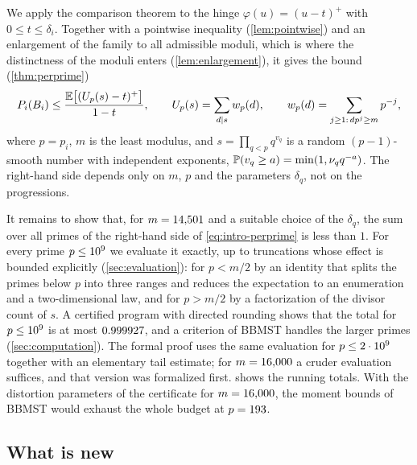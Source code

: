 We apply the comparison theorem to the hinge $\varphi(u)=(u-t)^+$ with $0\le t\le\delta_i$. Together with a pointwise
inequality (\cref{lem:pointwise}) and an enlargement of the family to all admissible moduli, which is where the
distinctness of the moduli enters (\cref{lem:enlargement}), it gives the bound (\cref{thm:perprime})
\begin{equation}\label{eq:intro-perprime}
  P_i(B_i)\le\frac{\E\bigl[(U_p(s)-t)^+\bigr]}{1-t},\qquad U_p(s)=\sum_{d\mid s}w_p(d),\qquad
  w_p(d)=\sum_{j\ge1:\,dp^j\ge m}p^{-j},
\end{equation}
where $p=p_i$, $m$ is the least modulus, and $s=\prod_{q<p}q^{v_q}$ is a random $(p-1)$-smooth number with
independent exponents, $\P(v_q\ge a)=\min(1,\nu_q q^{-a})$. The right-hand side depends only on $m$, $p$ and the
parameters $\delta_q$, not on the progressions.

It remains to show that, for $m=\Mzero$ and a suitable choice of the $\delta_q$, the sum over all primes of the
right-hand side of \eqref{eq:intro-perprime} is less than $1$. For every prime $p\le\PmaxMain$ we evaluate it
exactly, up to truncations whose effect is bounded explicitly (\cref{sec:evaluation}): for $p<m/2$ by an identity
that splits the primes below $p$ into three ranges and reduces the expectation to an enumeration and a
two-dimensional law, and for $p>m/2$ by a factorization of the divisor count of $s$. A certified program with
directed rounding shows that the total for $p\le\PmaxMain$ is at most $\etaMain$, and a criterion of BBMST handles
the larger primes (\cref{sec:computation}). The formal proof uses the same evaluation for $p\le\XFormal$ together
with an elementary tail estimate; for $m=\MzeroLean$ a cruder evaluation suffices, and that version was formalized
first.  shows the running
totals. With the distortion parameters of the certificate for $m=\MzeroLean$, the moment bounds of BBMST would
exhaust the whole budget at $p=\bbPassP$.

\subsection{What is new}\label{sec:intro-new}

